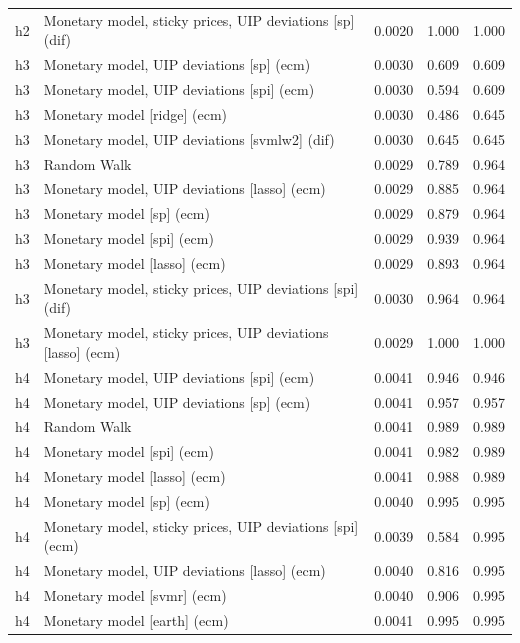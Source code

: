 \begin{ThreePartTable}
\begin{longtable}[t]{cp{5.5cm}ccc}
h2 & \raggedright Monetary model, sticky prices, UIP deviations [sp] (dif) & 0.0020 & 1.000 & 1.000\\
\addlinespace
h3 & \raggedright Monetary model, UIP deviations [sp] (ecm) & 0.0030 & 0.609 & 0.609\\
h3 & \raggedright Monetary model, UIP deviations [spi] (ecm) & 0.0030 & 0.594 & 0.609\\
h3 & \raggedright Monetary model [ridge] (ecm) & 0.0030 & 0.486 & 0.645\\
h3 & \raggedright Monetary model, UIP deviations [svmlw2] (dif) & 0.0030 & 0.645 & 0.645\\
h3 & \raggedright Random Walk & 0.0029 & 0.789 & 0.964\\
h3 & \raggedright Monetary model, UIP deviations [lasso] (ecm) & 0.0029 & 0.885 & 0.964\\
h3 & \raggedright Monetary model [sp] (ecm) & 0.0029 & 0.879 & 0.964\\
h3 & \raggedright Monetary model [spi] (ecm) & 0.0029 & 0.939 & 0.964\\
h3 & \raggedright Monetary model [lasso] (ecm) & 0.0029 & 0.893 & 0.964\\
h3 & \raggedright Monetary model, sticky prices, UIP deviations [spi] (dif) & 0.0030 & 0.964 & 0.964\\
h3 & \raggedright Monetary model, sticky prices, UIP deviations [lasso] (ecm) & 0.0029 & 1.000 & 1.000\\
\addlinespace
h4 & \raggedright Monetary model, UIP deviations [spi] (ecm) & 0.0041 & 0.946 & 0.946\\
h4 & \raggedright Monetary model, UIP deviations [sp] (ecm) & 0.0041 & 0.957 & 0.957\\
h4 & \raggedright Random Walk & 0.0041 & 0.989 & 0.989\\
h4 & \raggedright Monetary model [spi] (ecm) & 0.0041 & 0.982 & 0.989\\
h4 & \raggedright Monetary model [lasso] (ecm) & 0.0041 & 0.988 & 0.989\\
h4 & \raggedright Monetary model [sp] (ecm) & 0.0040 & 0.995 & 0.995\\
h4 & \raggedright Monetary model, sticky prices, UIP deviations [spi] (ecm) & 0.0039 & 0.584 & 0.995\\
h4 & \raggedright Monetary model, UIP deviations [lasso] (ecm) & 0.0040 & 0.816 & 0.995\\
h4 & \raggedright Monetary model [svmr] (ecm) & 0.0040 & 0.906 & 0.995\\
h4 & \raggedright Monetary model [earth] (ecm) & 0.0041 & 0.995 & 0.995\\

\end{longtable}
\end{ThreePartTable}
